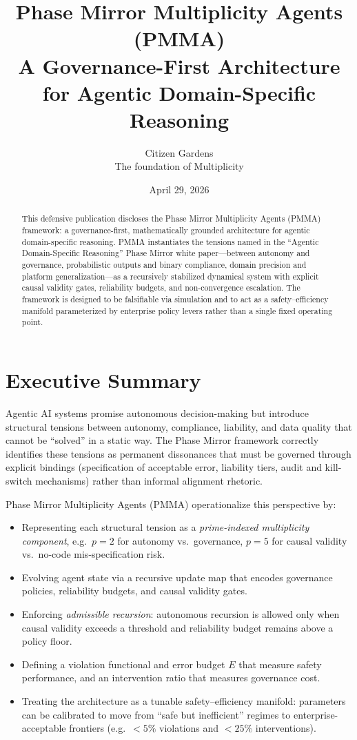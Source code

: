 \documentclass[11pt]{article}
\title{Phase Mirror Multiplicity Agents (PMMA) \\
\large A Governance-First Architecture for Agentic Domain-Specific Reasoning}
\author{Citizen Gardens \\ The foundation of Multiplicity}
\date{April 29, 2026}
\begin{document}
\maketitle

\begin{abstract}
This defensive publication discloses the Phase Mirror Multiplicity Agents (PMMA) framework: a governance-first, mathematically grounded architecture for agentic domain-specific reasoning.
PMMA instantiates the tensions named in the ``Agentic Domain-Specific Reasoning'' Phase Mirror white paper---between autonomy and governance, probabilistic outputs and binary compliance, domain precision and platform generalization---as a recursively stabilized dynamical system with explicit causal validity gates, reliability budgets, and non-convergence escalation.
The framework is designed to be falsifiable via simulation and to act as a safety--efficiency manifold parameterized by enterprise policy levers rather than a single fixed operating point.
\end{abstract}
\newpage
\tableofcontents
\section*{Executive Summary}

Agentic AI systems promise autonomous decision-making but introduce structural tensions between autonomy, compliance, liability, and data quality that cannot be ``solved'' in a static way.
The Phase Mirror framework correctly identifies these tensions as permanent dissonances that must be governed through explicit bindings (specification of acceptable error, liability tiers, audit and kill-switch mechanisms) rather than informal alignment rhetoric.

Phase Mirror Multiplicity Agents (PMMA) operationalize this perspective by:
\begin{itemize}
  \item Representing each structural tension as a \emph{prime-indexed multiplicity component}, e.g.\ $p=2$ for autonomy vs.\ governance, $p=5$ for causal validity vs.\ no-code mis-specification risk.
  \item Evolving agent state via a recursive update map that encodes governance policies, reliability budgets, and causal validity gates.
  \item Enforcing \emph{admissible recursion}: autonomous recursion is allowed only when causal validity exceeds a threshold and reliability budget remains above a policy floor.
  \item Defining a violation functional and error budget $E$ that measure safety performance, and an intervention ratio that measures governance cost.
  \item Treating the architecture as a tunable safety--efficiency manifold: parameters can be calibrated to move from ``safe but inefficient'' regimes to enterprise-acceptable frontiers (e.g.\ $<5\%$ violations and $<25\%$ interventions).
\end{itemize}
\end{document}
